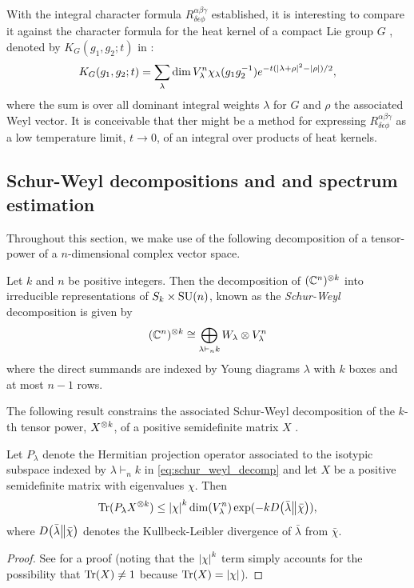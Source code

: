 \documentclass[notitlepage, 10pt]{article}
\begin{document}
{\color{blue}
\begin{rem}
    With the integral character formula $R^{\alpha\beta\gamma}_{\delta\epsilon\phi}$ established, it is interesting to compare it against the character formula for the heat kernel of a compact Lie group $G$ \cite{fegan1978heat}, denoted by $K_{G}(g_1, g_2 ; t)$ in \cite{mcswiggen2021harish}:
    \begin{equation}
        K_{G}(g_1, g_2; t) = \sum_{\lambda} \dim V_{\lambda}^{n} \chi_{\lambda}(g_1 g_2^{-1}) e^{-t(\left|\lambda+\rho\right|^{2} - \left|\rho\right|)/2},
    \end{equation}
    where the sum is over all dominant integral weights $\lambda$ for $G$ and $\rho$ the associated Weyl vector.
    It is conceivable that ther might be a method for expressing $R^{\alpha\beta\gamma}_{\delta\epsilon\phi}$ as a low temperature limit, $t \to 0$, of an integral over products of heat kernels.
\end{rem}
}

\subsection{Schur-Weyl decompositions and and spectrum estimation}
Throughout this section, we make use of the following decomposition of a tensor-power of a $n$-dimensional complex vector space.
\begin{prop}
    Let $k$ and $n$ be positive integers.
    Then the decomposition of $(\mathbb C^{n})^{\otimes k}$ into irreducible representations of $S_k \times \operatorname{SU}(n)$, known as the \textit{Schur-Weyl} decomposition is given by
    \begin{equation}
        \label{eq:schur_weyl_decomp}
        (\mathbb C^{n})^{\otimes k} \cong \bigoplus_{\lambda \vdash_{n} k} W_{\lambda} \otimes V_{\lambda}^{n}
    \end{equation}
    where the direct summands are indexed by Young diagrams $\lambda$ with $k$ boxes and at most $n-1$ rows.
\end{prop}
The following result constrains the associated Schur-Weyl decomposition of the $k$-th tensor power, $X^{\otimes k}$, of a positive semidefinite matrix $X$ \cite{christandl2008quantum,keyl2001estimating}.
\begin{prop}
    \label{prop:spec_est}
    Let $P_{\lambda}$ denote the Hermitian projection operator associated to the isotypic subspace indexed by $\lambda \vdash_{n} k$ in \cref{eq:schur_weyl_decomp} and let $X$ be a positive semidefinite matrix with eigenvalues $\chi$.
    Then
    \begin{equation}
        \operatorname{Tr}(P_{\lambda} X^{\otimes k}) \leq \left|\chi\right|^{k} \dim(V_{\lambda}^{n}) \exp(-k D\!\left(\bar \lambda\middle\|\bar \chi\right)),
    \end{equation}
    where $D\!\left(\bar \lambda\middle\|\bar \chi\right)$ denotes the Kullbeck-Leibler divergence of $\bar \lambda$ from $\bar \chi$.
\end{prop}
\begin{proof}
    See \cite{keyl2001estimating} for a proof (noting that the $\left|\chi\right|^{k}$ term simply accounts for the possibility that $\operatorname{Tr}(X) \neq 1$ because $\operatorname{Tr}(X) = \left|\chi\right|$).
\end{proof}
\end{document}
